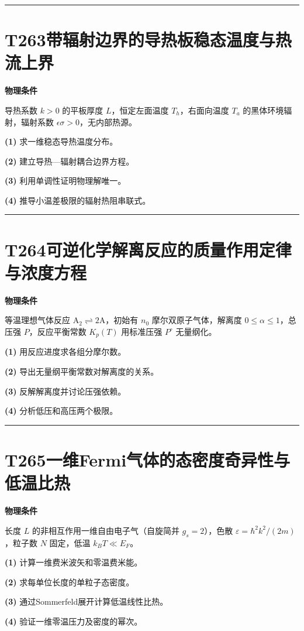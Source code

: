 \documentclass[UTF8,a4paper,11pt,oneside,openany]{ctexbook}
\begin{document}
\par\bigskip\hrule\bigskip
\section*{T263\quad 带辐射边界的导热板稳态温度与热流上界}
\textbf{物理条件}\par 导热系数 \(k>0\) 的平板厚度 \(L\)，恒定左面温度 \(T_h\)，右面向温度 \(T_a\) 的黑体环境辐射，辐射系数 \(\epsilon\sigma>0\)，无内部热源。
\par\noindent\textbf{(1)} 求一维稳态导热温度分布。
\par\noindent\textbf{(2)} 建立导热—辐射耦合边界方程。
\par\noindent\textbf{(3)} 利用单调性证明物理解唯一。
\par\noindent\textbf{(4)} 推导小温差极限的辐射热阻串联式。

\par\bigskip\hrule\bigskip
\section*{T264\quad 可逆化学解离反应的质量作用定律与浓度方程}
\textbf{物理条件}\par 等温理想气体反应 \(\mathrm A_2\rightleftharpoons2\mathrm A\)，初始有 \(n_0\) 摩尔双原子气体，解离度 \(0\le\alpha\le1\)，总压强 \(P\)，反应平衡常数 \(K_p(T)\) 用标准压强 \(P^\circ\) 无量纲化。
\par\noindent\textbf{(1)} 用反应进度求各组分摩尔数。
\par\noindent\textbf{(2)} 导出无量纲平衡常数对解离度的关系。
\par\noindent\textbf{(3)} 反解解离度并讨论压强依赖。
\par\noindent\textbf{(4)} 分析低压和高压两个极限。

\par\bigskip\hrule\bigskip
\section*{T265\quad 一维Fermi气体的态密度奇异性与低温比热}
\textbf{物理条件}\par 长度 \(L\) 的非相互作用一维自由电子气（自旋简并 \(g_s=2\)），色散 \(\varepsilon=\hbar^2k^2/(2m)\)，粒子数 \(N\) 固定，低温 \(k_BT\ll E_F\)。
\par\noindent\textbf{(1)} 计算一维费米波矢和零温费米能。
\par\noindent\textbf{(2)} 求每单位长度的单粒子态密度。
\par\noindent\textbf{(3)} 通过Sommerfeld展开计算低温线性比热。
\par\noindent\textbf{(4)} 验证一维零温压力及密度的幂次。
\end{document}
